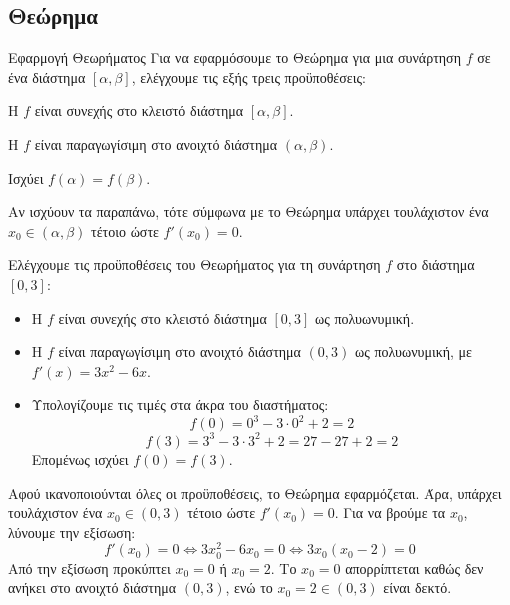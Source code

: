 \subsection{Θεώρημα }
\begin{askhsh}{Εφαρμογή Θεωρήματος }
Για να εφαρμόσουμε το Θεώρημα  για μια συνάρτηση $f$ σε ένα διάστημα $[\alpha,\beta]$, ελέγχουμε τις εξής τρεις προϋποθέσεις:

\bhmata
\begin{bhma}
\item Η $f$ είναι συνεχής στο κλειστό διάστημα $[\alpha,\beta]$.
\item Η $f$ είναι παραγωγίσιμη στο ανοιχτό διάστημα $(\alpha,\beta)$.
\item Ισχύει $f(\alpha)=f(\beta)$.
\end{bhma}
Αν ισχύουν τα παραπάνω, τότε σύμφωνα με το Θεώρημα  υπάρχει τουλάχιστον ένα $x_0 \in (\alpha,\beta)$ τέτοιο ώστε $f'(x_0)=0$.
\end{askhsh}

\lysh
Ελέγχουμε τις προϋποθέσεις του Θεωρήματος  για τη συνάρτηση $f$ στο διάστημα $[0,3]$:
\begin{itemize}
\item Η $f$ είναι συνεχής στο κλειστό διάστημα $[0,3]$ ως πολυωνυμική.
\item Η $f$ είναι παραγωγίσιμη στο ανοιχτό διάστημα $(0,3)$ ως πολυωνυμική, με $f'(x)=3x^2-6x$.
\item Υπολογίζουμε τις τιμές στα άκρα του διαστήματος:
\[ f(0) = 0^3-3\cdot 0^2+2 = 2 \]
\[ f(3) = 3^3-3\cdot 3^2+2 = 27-27+2 = 2 \]
Επομένως ισχύει $f(0)=f(3)$.
\end{itemize}
Αφού ικανοποιούνται όλες οι προϋποθέσεις, το Θεώρημα  εφαρμόζεται.
Άρα, υπάρχει τουλάχιστον ένα $x_0 \in (0,3)$ τέτοιο ώστε $f'(x_0)=0$. 
Για να βρούμε τα $x_0$, λύνουμε την εξίσωση:
\[ f'(x_0)=0 \Leftrightarrow 3x_0^2-6x_0=0 \Leftrightarrow 3x_0(x_0-2)=0 \]
Από την εξίσωση προκύπτει $x_0=0$ ή $x_0=2$. 
Το $x_0=0$ απορρίπτεται καθώς δεν ανήκει στο ανοιχτό διάστημα $(0,3)$, ενώ το $x_0=2 \in (0,3)$ είναι δεκτό.

